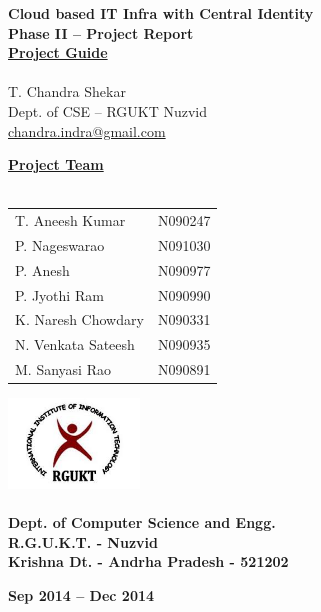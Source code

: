 \documentclass[12pt]{report}
\begin{document}
\begin{titlepage}
 \begin{center}
\LARGE
\textbf{Cloud based IT Infra with Central Identity} \\
\vfill
\textbf{Phase II -- Project Report }\\
\vfill
\Large
\underline{\textbf{Project Guide }} \\ 
\large
\underline{} \\
T. Chandra Shekar \\
\small
Dept. of CSE -- RGUKT Nuzvid \\
\small
\url{chandra.indra@gmail.com}
\vfill

\Large
\textbf{\underline{ Project Team } } \\
\underline{} \\
\large
\begin{tabular}{l  l}
T. Aneesh Kumar & N090247  \\
P. Nageswarao  & N091030  \\
P. Anesh  & N090977  \\
P. Jyothi Ram & N090990  \\
K. Naresh Chowdary  & N090331  \\
N. Venkata Sateesh  & N090935  \\
M. Sanyasi Rao & N090891 
\end{tabular}

\vfill


\includegraphics[width=3.5cm]{rgukt_logo.jpg} 
\Large
\underline{} \\
\underline{} \\
\normalsize
\textbf{Dept. of Computer Science and Engg. } \\
\textbf{R.G.U.K.T. - Nuzvid } \\
\textbf{Krishna Dt. - Andrha Pradesh - 521202}


\normalsize
\vfill
%
%

\textbf{Sep 2014 -- Dec 2014 }

\end{center}
\end{titlepage}
\end{document}
